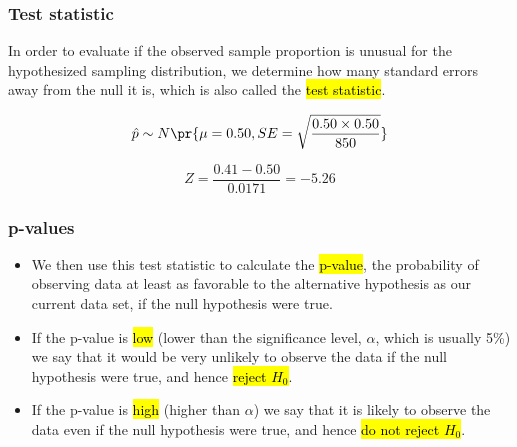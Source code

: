 \begin{frame}
\frametitle{Test statistic}
 
In order to evaluate if the observed sample proportion is unusual for the hypothesized sampling distribution, we determine how many standard errors away from the null it is, which is also called the \hl{test statistic}.
 
\pause
 
\[ \hat{p} \sim N \pr{ \mu = 0.50, SE = \sqrt{\frac{0.50 \times 0.50}{850} }  } \]

\pause

\[ Z = \frac{0.41 - 0.50}{0.0171} = -5.26 \]
 
 \pause
 
 
\pause
 
 
\end{frame}
 

\begin{frame}
\frametitle{p-values}

\begin{itemize}

\item We then use this test statistic to calculate the \hl{p-value}, the probability of observing data at least as favorable to the alternative hypothesis as our current data set, if the null hypothesis were true.

\pause

\item If the p-value is \hl{low} (lower than the significance level, $\alpha$, which is usually 5\%) we say that it would be very unlikely to observe the data if the null hypothesis were true, and hence \hl{reject $H_0$}.

\pause

\item If the p-value is \hl{high} (higher than $\alpha$) we say that it is likely to observe the data even if the null hypothesis were true, and hence \hl{do not reject $H_0$}.

\end{itemize}

\end{frame}

